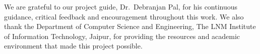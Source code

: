 We are grateful to our project guide, Dr.\ Debranjan Pal, for his continuous
guidance, critical feedback and encouragement throughout this work. We also thank
the Department of Computer Science and Engineering, The LNM Institute of Information
Technology, Jaipur, for providing the resources and academic environment that made
this project possible.
